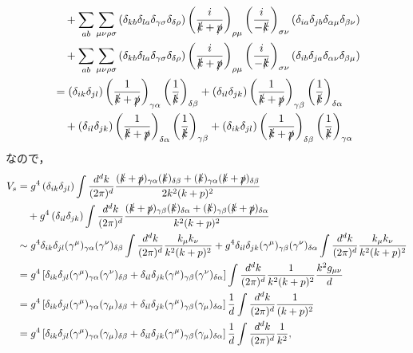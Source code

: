 \begin{align*}
  & \quad + \sum_{ab} \sum_{\mu\nu\rho\sigma}
  \left( \delta_{kb} \delta_{la} \delta_{\gamma\sigma} \delta_{\delta\rho} \right)
  \left( \frac{i}{\slashed{k} + \slashed{p}} \right)_{\rho\mu}
  \left( \frac{i}{-\slashed{k}} \right)_{\sigma\nu}
  \left( \delta_{ia} \delta_{jb} \delta_{\alpha\mu} \delta_{\beta\nu} \right) \\
  & \quad + \sum_{ab} \sum_{\mu\nu\rho\sigma}
  \left( \delta_{kb} \delta_{la} \delta_{\gamma\sigma} \delta_{\delta\rho} \right)
  \left( \frac{i}{\slashed{k} + \slashed{p}} \right)_{\rho\mu}
  \left( \frac{i}{-\slashed{k}} \right)_{\sigma\nu}
  \left( \delta_{ib} \delta_{ja} \delta_{\alpha\nu} \delta_{\beta\mu} \right) \\
  &= \left( \delta_{ik} \delta_{jl} \right) \left( \frac{1}{\slashed{k} + \slashed{p}} \right)_{\gamma\alpha} \left( \frac{1}{\slashed{k}} \right)_{\delta\beta}
  + \left( \delta_{il} \delta_{jk} \right) \left( \frac{1}{\slashed{k} + \slashed{p}} \right)_{\gamma\beta} \left( \frac{1}{\slashed{k}} \right)_{\delta\alpha} \\
  & \quad + \left( \delta_{il} \delta_{jk} \right) \left( \frac{1}{\slashed{k} + \slashed{p}} \right)_{\delta\alpha} \left( \frac{1}{\slashed{k}} \right)_{\gamma\beta}
  + \left( \delta_{ik} \delta_{jl} \right) \left( \frac{1}{\slashed{k} + \slashed{p}} \right)_{\delta\beta} \left( \frac{1}{\slashed{k}} \right)_{\gamma\alpha}
\end{align*}
なので，
\begin{align*}
  V_s &= g^4 \left( \delta_{ik} \delta_{jl} \right) \int \frac{d^dk}{(2\pi)^d}
  \frac{(\slashed{k} + \slashed{p})_{\gamma\alpha}(\slashed{k})_{\delta\beta} + (\slashed{k})_{\gamma\alpha}(\slashed{k} + \slashed{p})_{\delta\beta}}{2k^2(k+p)^2} \\
  & \quad + g^4 \left( \delta_{il} \delta_{jk} \right) \int \frac{d^dk}{(2\pi)^d}
  \frac{(\slashed{k} + \slashed{p})_{\gamma\beta}(\slashed{k})_{\delta\alpha} + (\slashed{k})_{\gamma\beta}(\slashed{k} + \slashed{p})_{\delta\alpha}}{k^2(k+p)^2} \\
  &\sim g^4 \delta_{ik} \delta_{jl} (\gamma^\mu)_{\gamma\alpha}(\gamma^\nu)_{\delta\beta} \int \frac{d^dk}{(2\pi)^d} \frac{k_\mu k_\nu}{k^2(k+p)^2}
  + g^4 \delta_{il} \delta_{jk} (\gamma^\mu)_{\gamma\beta}(\gamma^\nu)_{\delta\alpha} \int \frac{d^dk}{(2\pi)^d} \frac{k_\mu k_\nu}{k^2(k+p)^2} \\
  &= g^4 \left[ \delta_{ik} \delta_{jl} (\gamma^\mu)_{\gamma\alpha}(\gamma^\nu)_{\delta\beta}
  + \delta_{il} \delta_{jk} (\gamma^\mu)_{\gamma\beta}(\gamma^\nu)_{\delta\alpha} \right]
  \int \frac{d^dk}{(2\pi)^d} \frac{1}{k^2(k+p)^2} \frac{k^2 g_{\mu\nu}}{d} \\
  &= g^4 \left[ \delta_{ik} \delta_{jl} (\gamma^\mu)_{\gamma\alpha}(\gamma_\mu)_{\delta\beta}
  + \delta_{il} \delta_{jk} (\gamma^\mu)_{\gamma\beta}(\gamma_\mu)_{\delta\alpha} \right]
  \frac{1}{d} \int \frac{d^dk}{(2\pi)^d} \frac{1}{(k+p)^2} \\
  &= g^4 \left[ \delta_{ik} \delta_{jl} (\gamma^\mu)_{\gamma\alpha}(\gamma_\mu)_{\delta\beta}
  + \delta_{il} \delta_{jk} (\gamma^\mu)_{\gamma\beta}(\gamma_\mu)_{\delta\alpha} \right]
  \frac{1}{d} \int \frac{d^dk}{(2\pi)^d} \frac{1}{k^2} ,
\end{align*}
